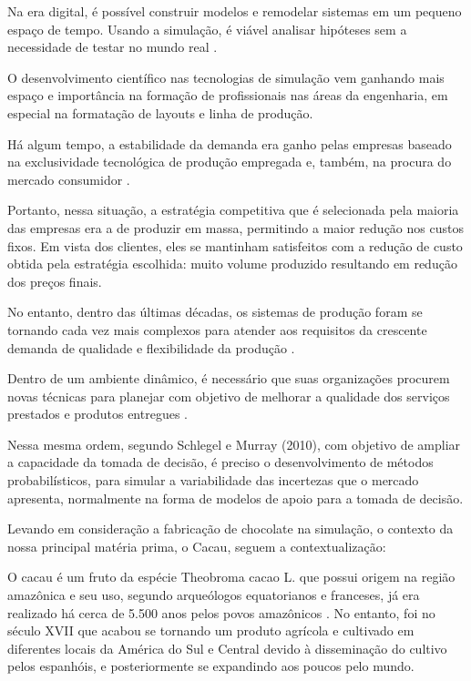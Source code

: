 \documentclass[
	12pt,				%
	openright,			%
	oneside,			%
	a4paper,			%
	english,			%
	french,				%
	spanish,			%
	brazil				%
	]{abntex2}
\begin{document}
Na era digital, é possível construir modelos e remodelar sistemas em um pequeno espaço de tempo. Usando a simulação, é viável analisar hipóteses sem a necessidade de testar no mundo real \cite{bateman}. 

O desenvolvimento científico nas tecnologias de simulação vem ganhando mais espaço e importância na formação de profissionais nas áreas da engenharia, em especial na formatação de layouts e linha de produção.

Há algum tempo, a estabilidade da demanda era ganho pelas empresas baseado na exclusividade tecnológica de produção empregada e, também, na procura do mercado consumidor \cite{wang}. 

Portanto, nessa situação, a estratégia competitiva que é selecionada pela maioria das empresas era a de produzir em massa, permitindo a maior redução nos custos fixos. Em vista dos clientes, eles se mantinham satisfeitos com a redução de custo obtida pela estratégia escolhida: muito volume produzido resultando em redução dos preços finais.

No entanto, dentro das últimas décadas, os sistemas de produção foram se tornando cada vez mais complexos para atender aos requisitos da crescente demanda de qualidade e flexibilidade da produção \cite{popovics}. 

Dentro de um ambiente dinâmico, é necessário que suas organizações procurem novas técnicas para planejar com objetivo de melhorar a qualidade dos serviços prestados e produtos entregues \cite{junior}.

Nessa mesma  ordem, segundo Schlegel e Murray (2010), com objetivo de ampliar a capacidade da tomada de decisão, é preciso o desenvolvimento de métodos probabilísticos, para simular a variabilidade das incertezas que o mercado apresenta, normalmente na forma de modelos de apoio para a tomada de decisão.

Levando em consideração a fabricação de chocolate na simulação, o contexto da nossa principal matéria prima, o Cacau, seguem a contextualização: 

O cacau é um fruto da espécie Theobroma cacao L. que possui origem na região amazônica e seu uso, segundo arqueólogos equatorianos e franceses, já era realizado há cerca de 5.500 anos pelos povos amazônicos \cite{unesco}. No entanto, foi no século XVII que acabou se tornando um produto agrícola e cultivado em diferentes locais da América do Sul e Central devido à disseminação do cultivo pelos espanhóis, e posteriormente se expandindo aos poucos pelo mundo. \cite{senar} 
\end{document}
